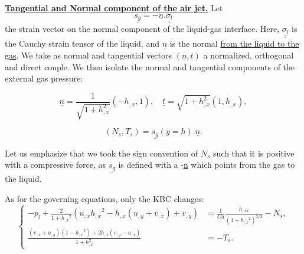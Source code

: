 \documentclass[12pt]{article}
\begin{document}
\underline{\textbf{Tangential and Normal component of the air jet.}}
Let 
\begin{equation}
    \underline{s_g}= -\underline{n}.\underline{\underline{\sigma_l}}
\end{equation}
the strain vector on the normal component of the liquid-gas interface. Here, $\underline{\underline{\sigma_l}}$ is the Cauchy strain tensor of the liquid, and $\underline{n}$ is the normal \underline{from the liquid to the gas}. We take as normal and tangential vectors $(\underline{n}, \underline{t})$ a normalized, orthogonal and direct couple. We then isolate the normal and tangential components of the external gas pressure:

 \begin{equation}
     \underline{n}=\frac{1}{\sqrt{1+h_{,x}^2}}(-h_{,x}, 1), \quad \underline{t} = \sqrt{1+h_{,x}^2}(1, h_{,x}),
 \end{equation}

\begin{equation}
    \boxed{
    (N_s, T_s) =  \underline{s_g}(y=h).\underline{n}.
    }
\end{equation}

Let us emphasize that we took the sign convention of $N_s$ such that it is positive with a compressive force, as
 $\underline{s_g}$ is defined with a -\underline{n} which points from the gas to the liquid. 

As for the governing equations, only the KBC changes: 
\begin{equation}\label{eq DBC_Control}
    \left\{
    \begin{aligned}
    -p_l + \frac{2}{1+{h_{,x}}^2}(u_{,x}{h_{,x}}^2 - h_{,x}(u_{,y} + v_{,x})+v_{,y}) &= \frac{1}{Ca} \frac{h_{,xx}}{(1+{h_{,x}}^2)^{3/2}}-N_s, \\
    \frac{(v_{,x} + u_{,y})(1-{h_{,x}}^2)+2h_{,x}(v_{,y}-u_{,x})}{1+h_{,x}^2} &= -T_s.
    \end{aligned}
    \right.
\end{equation}
\vspace{0.5cm}
\end{document}
